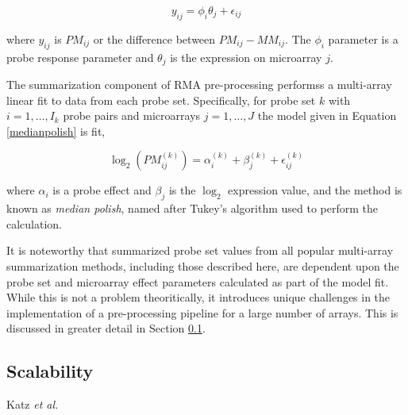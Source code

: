 \begin{equation}
\label{mbeisummary}
y_{ij} = \phi_i \theta_j + \epsilon_{ij}
\end{equation}

where $y_{ij}$ is $PM_{ij}$ or the difference between $PM_{ij}-MM_{ij}$. The
$\phi_i$ parameter is a probe response parameter and $\theta_j$ is the
expression on microarray $j$.

The summarization component of RMA pre-processing \cite{rma} performss a
multi-array linear fit to data from each probe set.  Specifically, for probe
set $k$ with $i=1,\dots,I_k$ probe pairs and microarrays $j=1,\dots,J$ the
model given in Equation \ref{medianpolish} is fit,

\begin{equation}
\label{medianpolish}
\log_2\left(PM^{(k)}_{ij}\right) = \alpha_i^{(k)} + \beta_j^{(k)} + \epsilon_{ij}^{(k)}
\end{equation}

where $\alpha_i$ is a probe effect and $\beta_j$ is the $\log_2$ expression
value, and the method is known as \emph{median polish}, named after Tukey's
algorithm used to perform the calculation.

It is noteworthy that summarized probe set values from all popular multi-array
summarization methods, including those described here, are dependent upon the
probe set and microarray effect parameters calculated as part of the model fit.
While this is not a problem theoritically, it introduces unique challenges in
the implementation of a pre-processing pipeline for a large number of arrays.
This is discussed in greater detail in Section \ref{Scalability}.

\subsection{Scalability}\label{Scalability}

Katz \emph{et al.} \cite{genelogic}

